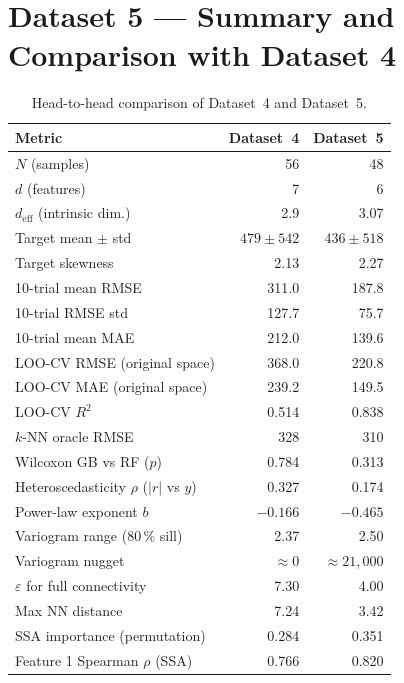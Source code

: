 \documentclass[12pt,a4paper]{article}
\begin{document}
\section{Dataset 5 — Summary and Comparison with Dataset 4}
\label{sec:ds5_conclusions}

\begin{table}[h]
\centering
\caption{Head-to-head comparison of Dataset~4 and Dataset~5.}
\label{tab:ds5_comparison}
\small
\begin{tabular}{lrr}
\toprule
Metric & Dataset~4 & Dataset~5 \\
\midrule
$N$ (samples)                        & 56    & 48 \\
$d$ (features)                       & 7     & 6 \\
$d_\text{eff}$ (intrinsic dim.)      & 2.9   & 3.07 \\
Target mean $\pm$ std                & $479 \pm 542$ & $436 \pm 518$ \\
Target skewness                      & 2.13  & 2.27 \\
\midrule
10-trial mean RMSE                   & 311.0 & 187.8 \\
10-trial RMSE std                    & 127.7 & 75.7 \\
10-trial mean MAE                    & 212.0 & 139.6 \\
LOO-CV RMSE (original space)         & 368.0 & 220.8 \\
LOO-CV MAE  (original space)         & 239.2 & 149.5 \\
LOO-CV $R^2$                         & 0.514 & 0.838 \\
$k$-NN oracle RMSE                   & 328   & 310 \\
Wilcoxon GB vs RF ($p$)              & 0.784 & 0.313 \\
Heteroscedasticity $\rho$ ($|r|$ vs $y$) & 0.327 & 0.174 \\
\midrule
Power-law exponent $b$               & $-0.166$ & $-0.465$ \\
Variogram range (80\,\% sill)        & 2.37  & 2.50 \\
Variogram nugget                     & $\approx 0$ & $\approx 21{,}000$ \\
$\varepsilon$ for full connectivity  & 7.30  & 4.00 \\
Max NN distance                      & 7.24  & 3.42 \\
\midrule
SSA importance (permutation)         & 0.284 & 0.351 \\
Feature 1 Spearman $\rho$ (SSA)      & 0.766 & 0.820 \\
\bottomrule
\end{tabular}
\end{table}
\end{document}

